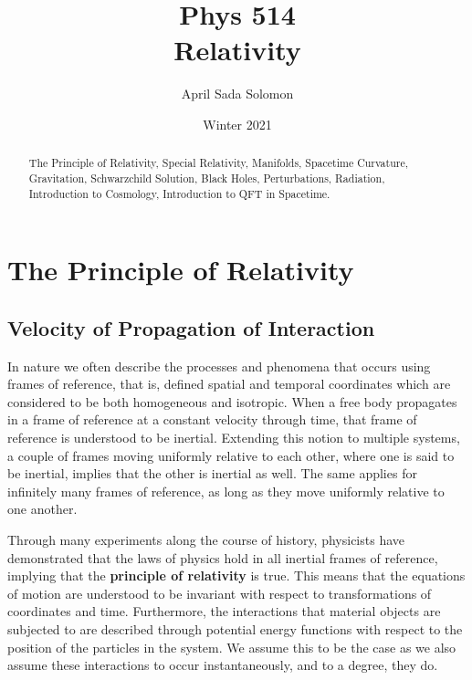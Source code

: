 \documentclass{article}
\title{Phys 514 \\
	\large Relativity}
\author{April Sada Solomon}
\date{Winter 2021}
\begin{document}
	\clearpage
	\maketitle
	
	\vspace{2cm}
	
	\renewcommand{\abstractname}{Course Description}
	\begin{abstract}
		The Principle of Relativity, Special Relativity, Manifolds, Spacetime Curvature, Gravitation, Schwarzchild Solution, Black Holes, Perturbations, Radiation, Introduction to Cosmology, Introduction to QFT in Spacetime. 
	\end{abstract}
	
	\newpage
	
	\tableofcontents
	
	\newpage
	
	\setcounter{page}{1}
	\cfoot{\thepage}
	
	\section{The Principle of Relativity}
		\subsection{Velocity of Propagation of Interaction}
			In nature we often describe the processes and phenomena that occurs using frames of reference, that is, defined spatial and temporal coordinates which are considered to be both homogeneous and isotropic. When a free body propagates in a frame of reference at a constant velocity through time, that frame of reference is understood to be inertial. Extending this notion to multiple systems, a couple of frames moving uniformly relative to each other, where one is said to be inertial, implies that the other is inertial as well. The same applies for infinitely many frames of reference, as long as they move uniformly relative to one another.
			
			Through many experiments along the course of history, physicists have demonstrated that the laws of physics hold in all inertial frames of reference, implying that the \textbf{principle of relativity} is true. This means that the equations of motion are understood to be invariant with respect to transformations of coordinates and time. Furthermore, the interactions that material objects are subjected to are described through potential energy functions with respect to the position of the particles in the system. We assume this to be the case as we also assume these interactions to occur instantaneously, and to a degree, they do. 
			
\end{document}
